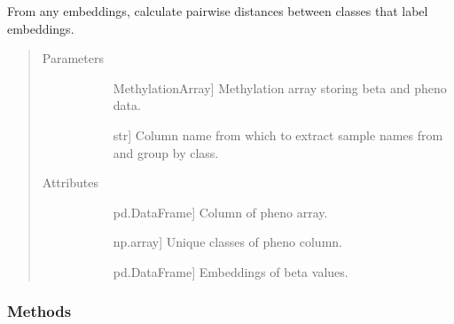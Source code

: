 \documentclass[letterpaper,10pt,english]{sphinxmanual}
\begin{document}
\begin{fulllineitems}
\label{\detokenize{index:methylnet.interpretation_classes.DistanceMatrixCompute}}
From any embeddings, calculate pairwise distances between classes that label embeddings.
\begin{quote}\begin{description}
\item[{Parameters}] \leavevmode\begin{description}
\item[{}] \leavevmode{[}MethylationArray{]}
Methylation array storing beta and pheno data.

\item[{}] \leavevmode{[}str{]}
Column name from which to extract sample names from and group by class.

\end{description}

\item[{Attributes}] \leavevmode\begin{description}
\item[{}] \leavevmode{[}pd.DataFrame{]}
Column of pheno array.

\item[{}] \leavevmode{[}np.array{]}
Unique classes of pheno column.

\item[{}] \leavevmode{[}pd.DataFrame{]}
Embeddings of beta values.

\end{description}

\end{description}\end{quote}
\subsubsection*{Methods}


\begin{savenotes}\sphinxatlongtablestart\begin{longtable}{}
\hline

\endfirsthead

%
{}\\
\hline


\end{longtable}
\end{savenotes}
\end{fulllineitems}
\end{document}
